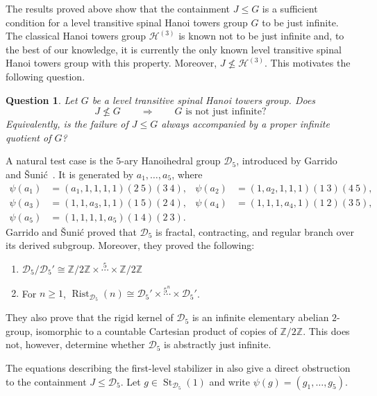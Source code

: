 \documentclass[11pt,leqno]{amsart}
\theoremstyle{plain}
\newtheorem{question}[question]{Question}
\DeclareMathOperator{\St}{St}
\DeclareMathOperator{\Rist}{Rist}
\newcommand{\Dfive}{\mathcal D_{5}}
\numberwithin{equation}{section}
\begin{document}
The results proved above show that the containment $J\leq G$ is a sufficient condition for a level transitive spinal Hanoi towers group $G$ to be just infinite. The classical Hanoi towers group $\mathcal{H}^{(3)}$ is known not to be just infinite \cite{Rachel} and, to the best of our knowledge, it is currently the only known level transitive spinal Hanoi towers group with this property. Moreover, $J\nleq \mathcal{H}^{(3)}$. This motivates the following question.

\begin{question}\label{q:general}
	Let $G$ be a level transitive spinal Hanoi towers group. Does
	\[
	J\nleq G
	\qquad\Longrightarrow\qquad
	G\text{ is not just infinite}?
	\]
	Equivalently, is the failure of $J\leq G$ always accompanied by a proper infinite quotient of $G$?
\end{question}
A natural test case is the $5$-ary Hanoihedral group $\Dfive$, introduced by Garrido and \v{S}uni\'c~\cite{GarridoSunic2025}. It is generated by $a_1,\ldots,a_5$, where
\begin{align*}
	\psi(a_1)&=(a_1,1,1,1,1)(2 \ 5)(3 \ 4),&
	\psi(a_2)&=(1,a_2,1,1,1)(1\ 3)(4 \ 5),\\
	\psi(a_3)&=(1,1,a_3,1,1)(1 \ 5)(2 \ 4),&
	\psi(a_4)&=(1,1,1,a_4,1)(1 \ 2)(3 \ 5),\\
	\psi(a_5)&=(1,1,1,1,a_5)(1 \ 4)(2 \ 3).
\end{align*}
Garrido and \v{S}uni\'c proved that $\Dfive$ is fractal, contracting, and regular branch over its derived subgroup. Moreover, they proved the following:
\begin{enumerate}
    \item $\Dfive/\Dfive'\cong \mathbb Z/2\mathbb Z\times\stackrel{5}{\cdots}\times\mathbb Z/2\mathbb Z$
\item For $n \geq 1$, $\Rist_{\Dfive}(n)\cong \Dfive'\times\stackrel{5^n}{\cdots}\times\Dfive'$.
\end{enumerate}


They also prove that the rigid kernel of $\Dfive$ is an infinite
elementary abelian $2$-group, isomorphic to a countable Cartesian
product of copies of $\mathbb{Z}/2\mathbb{Z}$. This does not, however,
determine whether $\Dfive$ is abstractly just infinite.

The equations describing the first-level stabilizer in
\cite[Proposition~3.7(iii)]{GarridoSunic2025} also give a direct
obstruction to the containment $J\leq \Dfive$. Let
$g\in \St_{\Dfive}(1)$ and write $\psi(g)=(g_1,\ldots,g_5)$.
\end{document}

